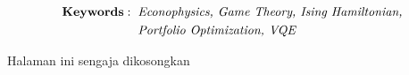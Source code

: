 \begin{minipage}{1cm}
	\begin{align*}
	\text{\textbf{Keywords}}:\hspace{2mm}&\text{\textit{Econophysics, Game Theory, Ising Hamiltonian,}} \\
	&\text{\textit{Portfolio Optimization, VQE}} 
	\end{align*}
\end{minipage}

\newpage
\thispagestyle{empty}
\vspace*{\fill}
    \begin{center}
	Halaman ini sengaja dikosongkan
    \end{center}
\vspace*{\fill}
\pagebreak
